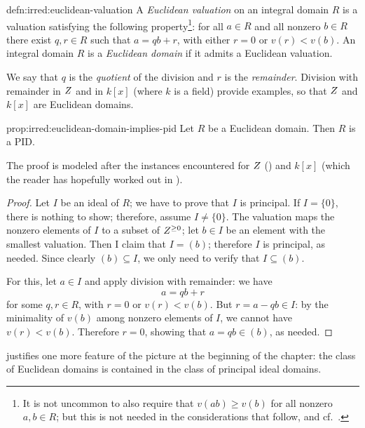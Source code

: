 \begin{defn}{}{defn:irred:euclidean-valuation}
  A \emph{Euclidean valuation} on an integral domain $R$ is a
  valuation satisfying the following property\footnote{It is not
    uncommon to also require that $v(ab) \geq v(b)$ for all nonzero
    $a, b \in R$; but this is not needed in the considerations that
    follow, and cf.\
    .}: for all
  $a \in R$ and all nonzero $b \in R$ there exist $q, r \in R$ such
  that $a = qb + r$, with either $r = 0$ or $v(r) < v(b)$. An integral
  domain $R$ is a \emph{Euclidean domain} if it admits a Euclidean
  valuation.
\end{defn}

We say that $q$ is the \emph{quotient} of the division and $r$ is the
\emph{remainder}. Division with remainder in $Z$ and in $k[x]$ (where
$k$ is a field) provide examples, so that $Z$ and $k[x]$ are
Euclidean domains.
\begin{prop}{}{prop:irred:euclidean-domain-implies-pid}
  Let $R$ be a Euclidean domain. Then $R$ is a PID.
\end{prop}

The proof is modeled after the instances encountered for $Z$
() and $k[x]$ (which the reader has hopefully
worked out in \Cref{exer:rings:field-poly-ring-pid}).

\begin{proof}
  Let $I$ be an ideal of $R$; we have to prove that $I$ is
  principal. If $I = \{0\}$, there is nothing to show; therefore,
  assume $I \neq \{0\}$.  The valuation maps the nonzero elements of
  $I$ to a subset of $Z^{\geq 0}$; let $b \in I$ be an element with
  the smallest valuation. Then I claim that $I = (b)$; therefore $I$
  is principal, as needed. Since clearly $(b) \subseteq I$, we only
  need to verify that $I \subseteq (b)$.

  For this, let $a \in I$ and apply division with remainder: we have
  \[a = qb + r\] for some $q, r \in R$, with $r = 0$ or $v(r) <
  v(b)$. But $r = a - qb \in I$: by the minimality of $v(b)$ among
  nonzero elements of $I$, we cannot have $v(r) < v(b)$. Therefore
  $r = 0$, showing that $a = qb \in (b)$, as needed.
\end{proof}
 justifies one more feature of the picture at the
beginning of the chapter: the class of Euclidean domains is contained
in the class of principal ideal domains.

